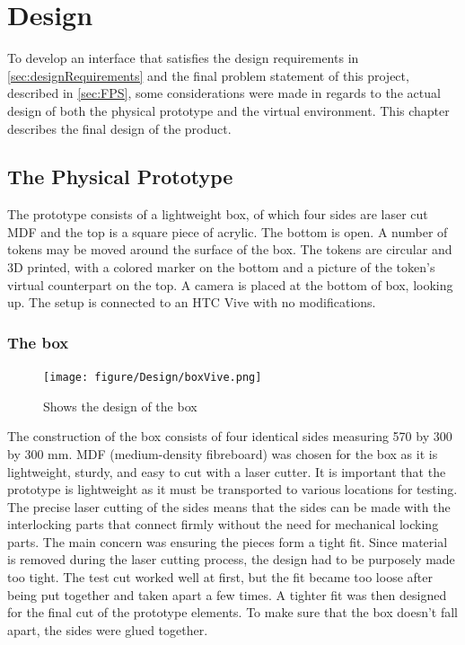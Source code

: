 \chapter{Design}
To develop an interface that satisfies the design requirements in \autoref{sec:designRequirements} and the final problem statement of this project, described in \autoref{sec:FPS}, some considerations were made in regards to the actual design of both the physical prototype and the virtual environment. This chapter describes the final design of the product.
\section{The Physical Prototype}

The prototype consists of a lightweight box, of which four sides are laser cut MDF and the top is a square piece of acrylic. The bottom is open. A number of tokens may be moved around the surface of the box. The tokens are circular and 3D printed, with a colored marker on the bottom and a picture of the token's virtual counterpart on the top. A camera is placed at the bottom of box, looking up. 
The setup is connected to an HTC Vive with no modifications.

\subsection{The box}
\begin{figure}[H]
	\centering
	\texttt{[image: figure/Design/boxVive.png]}
	\caption{Shows the design of the box}
	\label{fig:boxVive}
\end{figure}

The construction of the box consists of four identical sides measuring 570 by 300 by 300 mm. MDF (medium-density fibreboard) was chosen for the box as it is lightweight, sturdy, and easy to cut with a laser cutter. It is important that the prototype is lightweight as it must be transported to various locations for testing. The precise laser cutting of the sides means that the sides can be made with the interlocking parts that connect firmly without the need for mechanical locking parts. The main concern was ensuring the pieces form a tight fit. Since material is removed during the laser cutting process, the design had to be purposely made too tight. The test cut worked well at first, but the fit became too loose after being put together and taken apart a few times. A tighter fit was then designed for the final cut of the prototype elements. To make sure that the box doesn't fall apart, the sides were glued together. 

